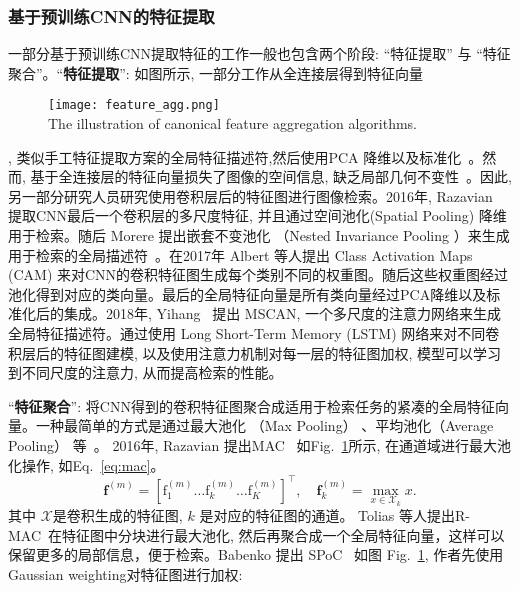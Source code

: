 \subsubsection{基于预训练CNN的特征提取}
一部分基于预训练CNN提取特征的工作一般也包含两个阶段: ``特征提取'' 与 ``特征聚合''。``\textbf{特征提取}'': 如图所示, 一部分工作从全连接层得到特征向量
\begin{figure}[!htp]
    \centering
    \texttt{[image: feature\_agg.png]} \\
      {The illustration of canonical feature aggregation algorithms.}
   \label{fig:featureagg}
\end{figure}
, 类似手工特征提取方案的全局特征描述符,然后使用PCA 降维以及标准化~\cite{sharif2014cnn,gong2014multi}。然而, 基于全连接层的特征向量损失了图像的空间信息, 缺乏局部几何不变性~\cite{gong2014multi}。因此, 另一部分研究人员研究使用卷积层后的特征图进行图像检索。2016年, Razavian~\cite{razavian2016visual} 提取CNN最后一个卷积层的多尺度特征, 并且通过空间池化(Spatial Pooling) 降维用于检索。随后 Morere 提出嵌套不变池化 （Nested Invariance Pooling ）来生成用于检索的全局描述符~\cite{morere2017nested}。在2017年 Albert \cite{jimenez2017class} 等人提出 Class Activation Maps (CAM) 来对CNN的卷积特征图生成每个类别不同的权重图。随后这些权重图经过池化得到对应的类向量。最后的全局特征向量是所有类向量经过PCA降维以及标准化后的集成。2018年, Yihang~\cite{lou2018multi} 提出 MSCAN, 一个多尺度的注意力网络来生成全局特征描述符。通过使用 Long Short-Term Memory (LSTM) 网络来对不同卷积层后的特征图建模, 以及使用注意力机制对每一层的特征图加权, 模型可以学习到不同尺度的注意力, 从而提高检索的性能。\par
``\textbf{特征聚合}'': 将CNN得到的卷积特征图聚合成适用于检索任务的紧凑的全局特征向量。一种最简单的方式是通过最大池化 （Max Pooling） 、平均池化（Average Pooling） 等~\cite{razavian2016visual, pang2018unifying}。
2016年, Razavian 提出MAC~\cite{razavian2016visual} 如Fig.~\ref{fig:featureagg}所示, 在通道域进行最大池化操作, 如Eq.~\ref{eq:mac}。
\begin{equation}
    \mathbf{f}^{(m)}=\left[\mathrm{f}_1^{(m)} \ldots \mathrm{f}_k^{(m)} \ldots \mathrm{f}_K^{(m)}\right]^{\top}, \quad \mathbf{f}_k^{(m)}=\max _{x \in \mathcal{X}_k} x.
    \label{eq:mac}
\end{equation}
其中 $\mathcal{X}$是卷积生成的特征图, $k$ 是对应的特征图的通道。
Tolias 等人提出R-MAC~\cite{tolias2015particular}在特征图中分块进行最大池化, 然后再聚合成一个全局特征向量，这样可以保留更多的局部信息，便于检索。Babenko 提出 SPoC~\cite{babenko2015aggregating} 如图 Fig.~\ref{fig:featureagg}, 作者先使用Gaussian weighting对特征图进行加权:
